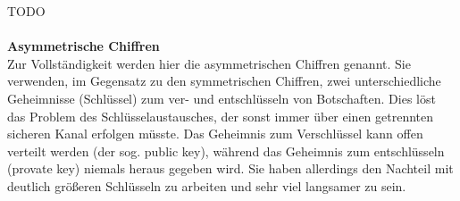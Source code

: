 \documentclass[13pt,a4paper,bibliography=totocnumbered,listof=totocnumbered]{scrartcl}
\begin{document}
\cite{6} \cite{7} \cite[S. 243f]{42} TODO
\\\\\textbf{Asymmetrische Chiffren}\\
Zur Vollständigkeit werden hier die asymmetrischen Chiffren genannt. Sie verwenden, im Gegensatz zu den symmetrischen Chiffren, zwei unterschiedliche Geheimnisse (Schlüssel) zum ver- und entschlüsseln von Botschaften. Dies löst das Problem des Schlüsselaustausches, der sonst immer über einen getrennten sicheren Kanal erfolgen müsste. Das Geheimnis zum Verschlüssel kann offen verteilt werden (der sog. public key), während das Geheimnis zum entschlüsseln (provate key) niemals heraus gegeben wird. Sie haben allerdings den Nachteil mit deutlich größeren Schlüsseln zu arbeiten und sehr viel langsamer zu sein.\\
\cite[S. 525]{42}
\end{document}
